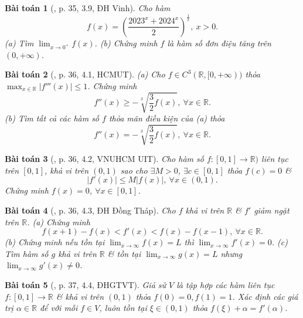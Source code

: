 \documentclass[oneside]{book}
\newtheorem{baitoan}{Bài toán}
\begin{document}
\begin{baitoan}[\cite{VMS_VMC2024}, p. 35, 3.9, ĐH Vinh]
	Cho hàm
	\begin{equation*}
		f(x) = \left(\frac{2023^x + 2024^x}{2}\right)^{\frac{1}{x}},\ x > 0.
	\end{equation*}
	(a) Tìm $\lim_{x\to0^+} f(x)$. (b) Chứng minh $f$ là hàm số đơn điệu tăng trên $(0,+\infty)$.
\end{baitoan}

\begin{baitoan}[\cite{VMS_VMC2024}, p. 36, 4.1, HCMUT]
	(a) Cho $f\in C^3(\mathbb{R},[0,+\infty))$ thỏa $\max_{x\in\mathbb{R}} |f'''(x)|\le1$. Chứng minh
	\begin{equation*}
		f''(x)\ge-\sqrt[3]{\frac{3}{2}f(x)},\ \forall x\in\mathbb{R}.
	\end{equation*}
	(b) Tìm tất cả các hàm số $f$ thỏa mãn điều kiện của (a) thỏa
	\begin{equation*}
		f''(x) = -\sqrt[3]{\frac{3}{2}f(x)},\ \forall x\in\mathbb{R}.
	\end{equation*}
\end{baitoan}

\begin{baitoan}[\cite{VMS_VMC2024}, p. 36, 4.2, VNUHCM UIT]
	Cho hàm số $f:[0,1]\to\mathbb{R})$ liên tục trên $[0,1]$, khả vi trên $(0,1)$ sao cho $\exists M > 0$, $\exists c\in[0,1]$ thỏa $f(c) = 0$ \&
	\begin{equation*}
		|f'(x)|\le M|f(x)|,\ \forall x\in(0,1).
	\end{equation*}
	Chứng minh $f(x) = 0$, $\forall x\in[0,1]$.
\end{baitoan}

\begin{baitoan}[\cite{VMS_VMC2024}, p. 36, 4.3, ĐH Đồng Tháp]
	Cho $f$ khả vi trên $\mathbb{R}$ \& $f'$ giảm ngặt trên $\mathbb{R}$. (a) Chứng minh
	\begin{equation*}
		f(x + 1) - f(x) < f'(x) < f(x) - f(x - 1),\ \forall x\in\mathbb{R}.
	\end{equation*}
	(b) Chứng minh nếu tồn tại $\lim_{x\to\infty} f(x) = L$ thì $\lim_{x\to\infty} f'(x) = 0$. (c) Tìm hàm số $g$ khả vi trên $\mathbb{R}$ \& tồn tại $\lim_{x\to\infty} g(x) = L$ nhưng $\lim_{x\to\infty} g'(x)\ne0$.
\end{baitoan}

\begin{baitoan}[\cite{VMS_VMC2024}, p. 37, 4.4, ĐHGTVT]
	Giả sử $V$ là tập hợp các hàm liên tục $f:[0,1]\to\mathbb{R}$ \& khả vi trên $(0,1)$ thỏa $f(0) = 0,f(1) = 1$. Xác định các giá trị $\alpha\in\mathbb{R}$ để với mỗi $f\in V$, luôn tồn tại $\xi\in(0,1)$ thỏa $f(\xi) + \alpha = f'(\alpha)$.
\end{baitoan}
\end{document}
